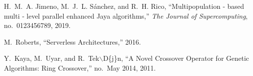 \documentclass[runningheads]{llncs}
\begin{document}
\begin{thebibliography}{10}
    H.~M.~A. Jimeno, M.~J.~L. S{\'{a}}nchez, and R.~H. Rico, ``{Multipopulation ‑
      based multi ‑ level parallel enhanced Jaya algorithms},'' {\em The Journal
      of Supercomputing}, no.~0123456789, 2019.
    
    M.~Roberts, ``{Serverless Architectures},'' 2016.
    
    Y.~Kaya, M.~Uyar, and R.~Tek$\backslash$D{\{}j{\}}n, ``{A Novel Crossover
      Operator for Genetic Algorithms: Ring Crossover},'' no.~May 2014, 2011.
    
    \end{thebibliography}
\end{document}
